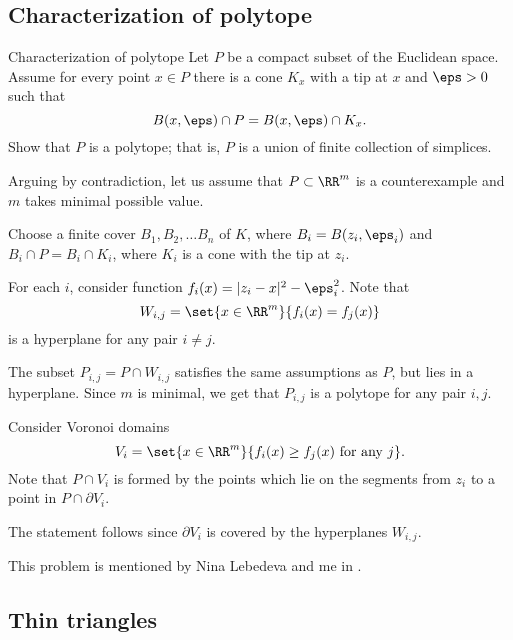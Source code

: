 \subsection*{Characterization of polytope}

\begin{pr}{}{Characterization of polytope}
\label{conic neighborhoods}
Let $P$ be a compact subset of the Euclidean space.
Assume for every point $x\in P$
there is a cone $K_x$ with a tip at $x$ and $\eps>0$
such that 
$$B(x,\eps)\cap P
=
B(x,\eps)\cap K_x.$$
Show that $P$ is a polytope; 
that is, $P$ is a union of finite collection of simplices.
\end{pr}
Arguing by contradiction, let us assume that $P\subset \RR^m$
is a counterexample and $m$ takes minimal possible value.

Choose a finite cover $B_1,B_2,\dots B_n$ of $K$,
where $B_i=B(z_i,\eps_i)$ 
and $B_i\cap P=B_i\cap K_i$, 
where $K_i$ is a cone with the tip at $z_i$.

For each $i$, consider function $f_i(x)=|z_i-x|^2-\eps_i^2$.
Note that
\[W_{i,j}=\set{x\in\RR^m}{f_i(x)=f_j(x)}\]
is a hyperplane for any pair $i\ne j$.

The subset $P_{i,j}=P\cap W_{i,j}$ satisfies the same assumptions as $P$, but lies in a hyperplane.
Since $m$ is minimal, we get that $P_{i,j}$ is a polytope for any pair $i,j$.

Consider Voronoi domains 
\[V_{i}=\set{x\in\RR^m}{f_i(x)\ge f_j(x) \ \text{for any}\ j}.\]
Note that $P\cap V_i$ is formed by the points which lie on the segments from $z_i$ to a point in  $P\cap \partial V_i$.

The statement follows since $\partial V_i$ is covered by the hyperplanes $W_{i,j}$.
\qeds

This problem is mentioned 
by Nina Lebedeva and me in \cite{lebedeva-petrunin}.














\subsection*{Thin triangles\easy}

